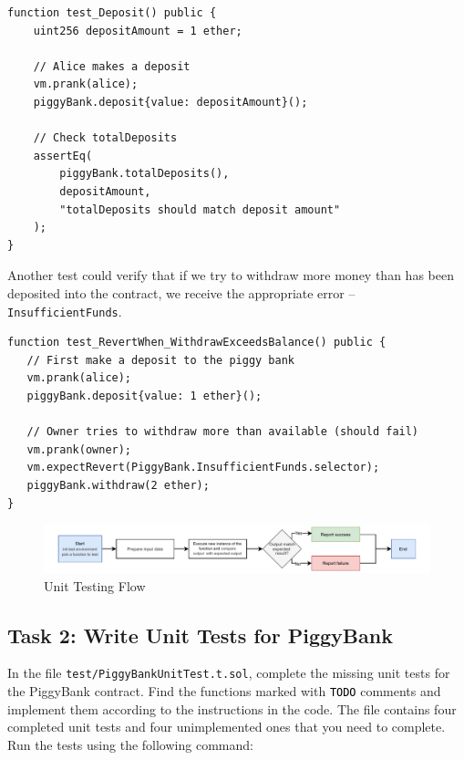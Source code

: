 \documentclass[12pt]{article}
\newcommand{\codegrey}[1]{%
  \texttt{\colorbox{black!4}{\textcolor{black}{#1}}}%
}
\begin{document}
\noindent \begin{minipage}{\textwidth}
    \begin{lstlisting}[language=Solidity]
function test_Deposit() public {
    uint256 depositAmount = 1 ether;
    
    // Alice makes a deposit
    vm.prank(alice);
    piggyBank.deposit{value: depositAmount}();
    
    // Check totalDeposits
    assertEq(
        piggyBank.totalDeposits(),
        depositAmount,
        "totalDeposits should match deposit amount"
    );
}
\end{lstlisting}
\end{minipage}

\noindent
Another test could verify that if we try to withdraw more money than has been deposited into the contract, we receive the appropriate error -- \texttt{InsufficientFunds}.

\noindent \begin{minipage}{\textwidth}
    \begin{lstlisting}[language=Solidity]
function test_RevertWhen_WithdrawExceedsBalance() public {
   // First make a deposit to the piggy bank
   vm.prank(alice);
   piggyBank.deposit{value: 1 ether}();

   // Owner tries to withdraw more than available (should fail)
   vm.prank(owner);
   vm.expectRevert(PiggyBank.InsufficientFunds.selector);
   piggyBank.withdraw(2 ether);
}
\end{lstlisting}
\end{minipage}

\begin{figure}[h!]
    \centering
    \includegraphics[width=1\textwidth]{unit-testing.pdf}
    \caption{Unit Testing Flow}\label{fig:unit-testing}
\end{figure}

\subsection*{Task 2: Write Unit Tests for PiggyBank}

In the file \texttt{test/PiggyBankUnitTest.t.sol}, complete the missing unit
tests for the PiggyBank contract. Find the functions marked with
\codegrey{TODO} comments and implement them according to the instructions in
the code. The file contains four completed unit tests and four unimplemented
ones that you need to complete. Run the tests using the following command:
\end{document}
